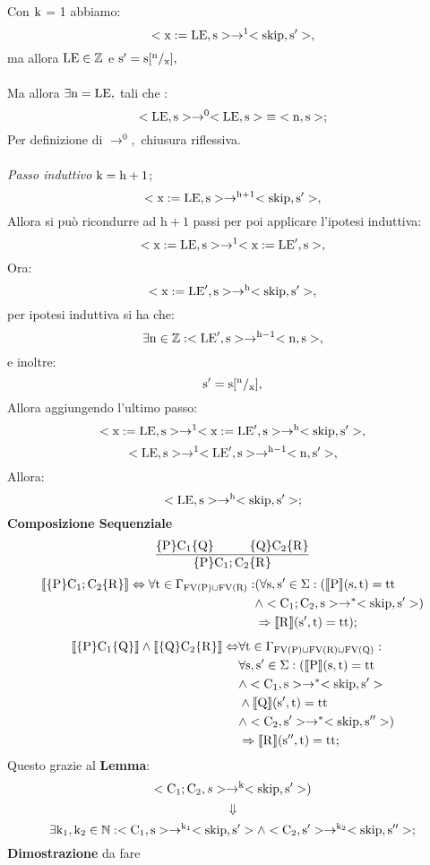 \documentclass[a4paper, 12pt, oneside,fleqn]{book}
\begin{document}
Con $\mathrm{k}$ = 1 abbiamo:
$$<\mathrm{x}:=\mathrm{LE},\mathrm{s}>\rightarrow ^1<\mathrm{skip},\mathrm{s}'>,$$
ma allora $\mathrm{LE} \in \mathbb{Z}$ e $\mathrm{s}'= \mathrm{s}[^\mathrm{n}/_{\mathrm{x}}],$\\\\
Ma allora $\exists\mathrm{n} = \mathrm{LE},$ tali che :
$$<\mathrm{LE},\mathrm{s}>\rightarrow ^0<\mathrm{LE},\mathrm{s}> \hspace{1mm} \equiv \hspace{1mm} <\mathrm{n},\mathrm{s}>;$$
Per definizione di $\rightarrow ^0,$ chiusura riflessiva.\\\\
\textit{Passo induttivo}
$\mathrm{k} = \mathrm{h}+1$;
$$<\mathrm{x}:=\mathrm{LE},\mathrm{s}>\rightarrow ^\mathrm{h+1}<\mathrm{skip},\mathrm{s}'>,$$
Allora si può ricondurre ad $\mathrm{h+1}$ passi per poi applicare l'ipotesi induttiva:
$$<\mathrm{x}:=\mathrm{LE},\mathrm{s}>\rightarrow ^1<\mathrm{x}:=\mathrm{LE}',\mathrm{s}>,$$
Ora:
$$<\mathrm{x}:=\mathrm{LE}',\mathrm{s}>\rightarrow ^\mathrm{h}<\mathrm{skip},\mathrm{s}'>,$$
per ipotesi induttiva si ha che:
$$\exists \mathrm{n} \in \mathbb{Z}\mathrel{:} <\mathrm{LE}',\mathrm{s}>\rightarrow ^\mathrm{{h}-1}<\mathrm{n},\mathrm{s}>,$$
e inoltre:
$$ \mathrm{s}'= \mathrm{s}[^\mathrm{n}/_{\mathrm{x}}],$$
Allora aggiungendo l'ultimo passo:
$$<\mathrm{x}:=\mathrm{LE},\mathrm{s}>\rightarrow ^1<\mathrm{x}:=\mathrm{LE}',\mathrm{s}>\rightarrow ^\mathrm{h}<\mathrm{skip},\mathrm{s}'>,$$
$$<\mathrm{LE},\mathrm{s}>\rightarrow ^1<\mathrm{LE}',\mathrm{s}>\rightarrow ^\mathrm{{h}-1}<\mathrm{n},\mathrm{s}'>, $$
Allora:
$$<\mathrm{LE},\mathrm{s}>\rightarrow ^\mathrm{h}<\mathrm{skip},\mathrm{s}'>;$$
\textbf{Composizione Sequenziale}
$$\frac{\{\mathrm{P}\}\mathrm{C}_1\{\mathrm{Q}\} \hspace{1cm} \{\mathrm{Q}\}\mathrm{C}_2\{\mathrm{R}\}}{\{\mathrm{P}\}\mathrm{C}_1;\mathrm{C}_2\{\mathrm{R}\}}$$
\begin{align*}
\llbracket \{\mathrm{P}\}\mathrm{C}_1;\mathrm{C}_2\{\mathrm{R}\} \rrbracket \Leftrightarrow \forall \mathrm{t} \in \Gamma_{\mathrm{FV}(\mathrm{P})\cup \mathrm{FV}(\mathrm{R})}\mathrel{:}
&(\forall \mathrm{s},\mathrm{s}'\in \Sigma \mathrel{:}(\llbracket \mathrm{P} \rrbracket(\mathrm{s},\mathrm{t}) = \mathrm{tt} \\
&\wedge <\mathrm{C}_1; \mathrm{C}_2,\mathrm{s}>\rightarrow ^*<\mathrm{skip},\mathrm{s}'>) \\
&\Rightarrow\llbracket \mathrm{R} \rrbracket(\mathrm{s}',\mathrm{t})=\mathrm{tt});
\end{align*}
\begin{align*}
\llbracket \{\mathrm{P}\}\mathrm{C}_1\{\mathrm{Q}\} \rrbracket \wedge \llbracket \{\mathrm{Q}\}\mathrm{C}_2\{\mathrm{R}\} \rrbracket \Leftrightarrow
&\forall \mathrm{t} \in \Gamma_{\mathrm{FV}(\mathrm{P})\cup\mathrm{FV}(\mathrm{R})\cup\mathrm{FV}(\mathrm{Q})}\mathrel{:}\\
&\forall \mathrm{s},\mathrm{s}'\in \Sigma \mathrel{:}(\llbracket \mathrm{P} \rrbracket(\mathrm{s},\mathrm{t}) = \mathrm{tt}\\
&\wedge <\mathrm{C}_1,\mathrm{s}>\rightarrow ^*<\mathrm{skip},\mathrm{s}'>\\
&\wedge \llbracket\mathrm{Q}\rrbracket(\mathrm{s}',\mathrm{t})=\mathrm{tt} \\
&\wedge <\mathrm{C}_2,\mathrm{s}'>\rightarrow ^*<\mathrm{skip},\mathrm{s}''>)\\
&\Rightarrow\llbracket \mathrm{R} \rrbracket(\mathrm{s}'',\mathrm{t})=\mathrm{tt};
\end{align*}
Questo grazie al \textbf{Lemma}:
$$<\mathrm{C}_1; \mathrm{C}_2,s>\rightarrow ^{\mathrm{k}}<\mathrm{skip},\mathrm{s}'>)$$
$$\Downarrow$$
$$\exists \mathrm{k}_1,\mathrm{k}_2 \in \mathbb{N}\mathrel{:}<\mathrm{C}_1,\mathrm{s}>\rightarrow ^{\mathrm{k}_1}<\mathrm{skip},\mathrm{s}'> \wedge <\mathrm{C}_2,\mathrm{s}'>\rightarrow ^{\mathrm{k}_2}<\mathrm{skip},\mathrm{s}''>;$$
\textbf{Dimostrazione} da fare
\end{document}
